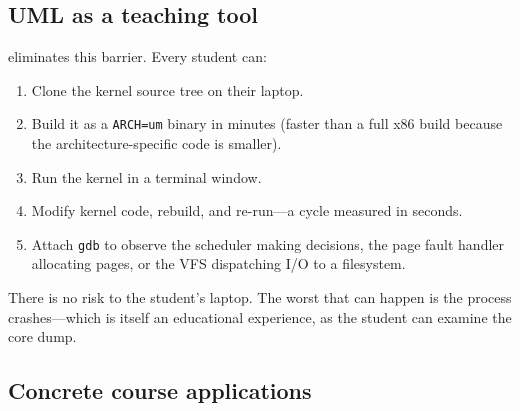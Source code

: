 \subsection{UML as a teaching tool}

\UML{} eliminates this barrier.  Every student can:

\begin{enumerate}[leftmargin=2em]
  \item Clone the kernel source tree on their laptop.
  \item Build it as a \texttt{ARCH=um} binary in minutes
        (faster than a full x86 build because the architecture-specific
        code is smaller).
  \item Run the kernel in a terminal window.
  \item Modify kernel code, rebuild, and re-run---a cycle measured in
        seconds.
  \item Attach \texttt{gdb} to observe the scheduler making decisions,
        the page fault handler allocating pages, or the VFS dispatching
        I/O to a filesystem.
\end{enumerate}

There is no risk to the student's laptop.  The worst that can happen
is the \UML{} process crashes---which is itself an educational
experience, as the student can examine the core dump.

\subsection{Concrete course applications}

